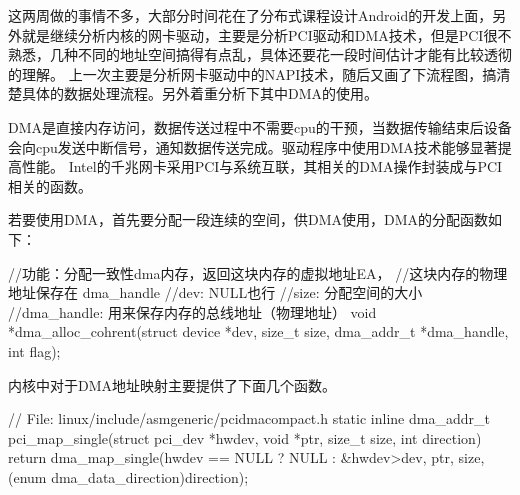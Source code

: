 \documentclass[fontsize=11pt, %
                             paper=a4, %
                             oneside, %
                             captions=tableheading,
                             index=totoc,
                             hyperref]{labbook}
\begin{document}
\begin{addmargin}[0cm]{0cm} %

\pagestyle{scrheadings} %

\indent 这两周做的事情不多，大部分时间花在了分布式课程设计Android的开发上面，另外就是继续分析内核的网卡驱动，主要是分析PCI驱动和DMA技术，但是PCI很不熟悉，几种不同的地址空间搞得有点乱，具体还要花一段时间估计才能有比较透彻的理解。
\indent 上一次主要是分析网卡驱动中的NAPI技术，随后又画了下流程图，搞清楚具体的数据处理流程。另外着重分析下其中DMA的使用。

\indent DMA是直接内存访问，数据传送过程中不需要cpu的干预，当数据传输结束后设备会向cpu发送中断信号，通知数据传送完成。驱动程序中使用DMA技术能够显著提高性能。
\indent Intel的千兆网卡采用PCI与系统互联，其相关的DMA操作封装成与PCI相关的函数。

\indent 若要使用DMA，首先要分配一段连续的空间，供DMA使用，DMA的分配函数如下：
\begin{pyglist}[language=c,caption={DMA分配},listingname=\textbf{Program},
	listingnamefont=\sffamily\bfseries\color{yellow},%
        captionfont=\sffamily\color{white},captionbgcolor=gray,
        fvset={frame=bottomline,framerule=4pt,rulecolor=\color{gray}}]
//功能：分配一致性dma内存，返回这块内存的虚拟地址EA，
//这块内存的物理地址保存在 dma_handle
//dev:  NULL也行
//size: 分配空间的大小
//dma_handle: 用来保存内存的总线地址（物理地址）
void *dma_alloc_cohrent(struct device *dev, size_t size, 
                       dma_addr_t *dma_handle, int flag);
\end{pyglist}

\indent 内核中对于DMA地址映射主要提供了下面几个函数。
\begin{pyglist}[language=c,caption={DMA地址映射函数},listingname=\textbf{Program},
	listingnamefont=\sffamily\bfseries\color{yellow},%
        captionfont=\sffamily\color{white},captionbgcolor=gray,
        fvset={frame=bottomline,framerule=4pt,rulecolor=\color{gray}}]
// File: linux/include/asm­generic/pci­dma­compact.h
static inline dma_addr_t 
pci_map_single(struct pci_dev *hwdev, void *ptr, size_t size, int
direction)
{
  return dma_map_single(hwdev == NULL ? NULL : &hwdev­>dev,
  ptr, size, (enum dma_data_direction)direction);
} 


\end{pyglist}
\end{addmargin}
\end{document}
